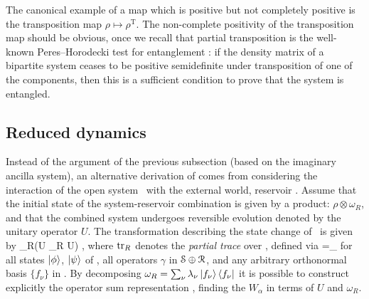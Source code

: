 The canonical example of a map which is positive but not completely positive is the transposition map $\rho\mapsto\rho^\text{T}$. The non-complete positivity of the transposition map should be obvious, once we recall that partial transposition is the well-known Peres--Horodecki test for entanglement \cite{peres_ppt_1996, horodecki_separability_1996}: if the density matrix of a bipartite system ceases to be positive semidefinite under transposition of one of the components, then this is a sufficient condition to prove that the system is entangled.

\subsection{Reduced dynamics}
\label{sec:reduced}
Instead of the argument of the previous subsection (based on the imaginary ancilla system), an alternative derivation of  comes from considering the interaction of the open system \SSS\ with the external world, reservoir \RRR\@. Assume that the initial state of the system-reservoir combination is given by a product: $\rho\otimes\omega_R$, and that the combined system undergoes reversible evolution denoted by the unitary operator $U$. The transformation describing the state change of \SSS\ is given by
\be
    \label{eq:rhomap}
    \rho\mapsto\tr_R(U \rho\otimes\omega_R U\dg) ,
\ee%
%
where $\operatorname{tr}_R$ denotes the \emph{partial trace} over \RRR, defined via
\be
    \label{eq:partialtrace}
    =\sum_\nu{}
\ee%
%
for all states $\left\lvert \phi \right\rangle$, $\left\lvert \psi \right\rangle$ of \SSS, all operators $\gamma$ in $\mathcal{S}\oplus\mathcal{R}$, and any arbitrary orthonormal basis $\{f_\nu\}$ in \RRR\@. By decomposing $\omega_R=\sum_\nu\lambda_\nu\left\lvert f_\nu \right\rangle\left\langle f_\nu \right\rvert$ it is possible \cite{alicki_lendi} to construct explicitly the operator sum representation , finding the $W_\alpha$ in terms of $U$ and $\omega_R$.

